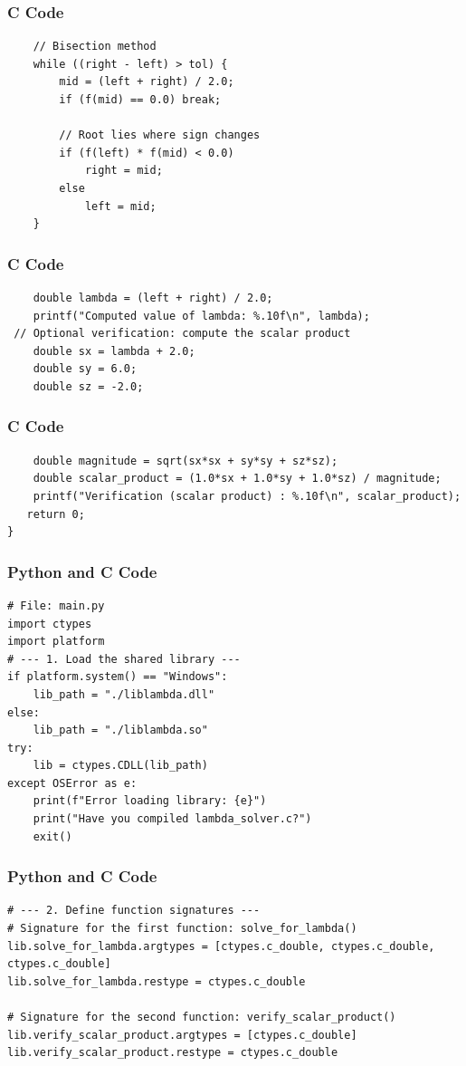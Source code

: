 \documentclass{beamer}
\begin{document}
\begin{frame}[fragile]
\frametitle{C Code}
\begin{lstlisting}
    // Bisection method
    while ((right - left) > tol) {
        mid = (left + right) / 2.0;
        if (f(mid) == 0.0) break;

        // Root lies where sign changes
        if (f(left) * f(mid) < 0.0)
            right = mid;
        else
            left = mid;
    }
\end{lstlisting}
\end{frame}

\begin{frame}[fragile]
\frametitle{C Code}
\begin{lstlisting}
    double lambda = (left + right) / 2.0;
    printf("Computed value of lambda: %.10f\n", lambda);
 // Optional verification: compute the scalar product
    double sx = lambda + 2.0;
    double sy = 6.0;
    double sz = -2.0;
\end{lstlisting}
\end{frame}

\begin{frame}[fragile]
\frametitle{C Code}
\begin{lstlisting}
    double magnitude = sqrt(sx*sx + sy*sy + sz*sz);
    double scalar_product = (1.0*sx + 1.0*sy + 1.0*sz) / magnitude;
    printf("Verification (scalar product) : %.10f\n", scalar_product);
   return 0;
}
\end{lstlisting}
\end{frame}

\begin{frame}[fragile]
\frametitle{Python and C Code}
\begin{lstlisting}
# File: main.py
import ctypes
import platform
# --- 1. Load the shared library ---
if platform.system() == "Windows":
    lib_path = "./liblambda.dll"
else:
    lib_path = "./liblambda.so"
try:
    lib = ctypes.CDLL(lib_path)
except OSError as e:
    print(f"Error loading library: {e}")
    print("Have you compiled lambda_solver.c?")
    exit()
\end{lstlisting}
\end{frame}

\begin{frame}[fragile]
\frametitle{Python and C Code}
\begin{lstlisting}
# --- 2. Define function signatures ---
# Signature for the first function: solve_for_lambda()
lib.solve_for_lambda.argtypes = [ctypes.c_double, ctypes.c_double, ctypes.c_double]
lib.solve_for_lambda.restype = ctypes.c_double

# Signature for the second function: verify_scalar_product()
lib.verify_scalar_product.argtypes = [ctypes.c_double]
lib.verify_scalar_product.restype = ctypes.c_double
\end{lstlisting}
\end{frame}
\end{document}
